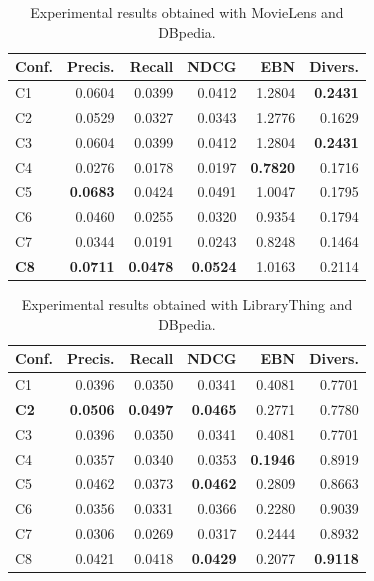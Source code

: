 \begin{table}
\centering
\begin{tabular}{@{}lrrrrr@{}}
\toprule
Conf.       & Precis.         & Recall          & NDCG            & EBN             & Divers. \\ \midrule
C1          & 0.0604          & 0.0399          & 0.0412          & 1.2804          & \textbf{0.2431} \\
C2          & 0.0529          & 0.0327          & 0.0343          & 1.2776          & 0.1629  \\
C3          & 0.0604          & 0.0399          & 0.0412          & 1.2804          & \textbf{0.2431} \\
C4          & 0.0276          & 0.0178          & 0.0197          & \textbf{0.7820} & 0.1716  \\
C5          & \textbf{0.0683} & 0.0424          & 0.0491          & 1.0047          & 0.1795  \\
C6          & 0.0460          & 0.0255          & 0.0320          & 0.9354          & 0.1794  \\
C7          & 0.0344          & 0.0191          & 0.0243          & 0.8248          & 0.1464  \\
\textbf{C8} & \textbf{0.0711} & \textbf{0.0478} & \textbf{0.0524} & 1.0163          & 0.2114  \\ \bottomrule
\end{tabular}
\caption[Experimental results with MovieLens and DBpedia]{Experimental results obtained with MovieLens and DBpedia.}
\label{srr:tab:ex1-ml}
\end{table}

\begin{table}
\centering
\begin{tabular}{@{}lrrrrr@{}}
\toprule
Conf.       & Precis.         & Recall          & NDCG            & EBN             & Divers. \\ \midrule
C1          & 0.0396          & 0.0350          & 0.0341          & 0.4081          & 0.7701  \\
\textbf{C2} & \textbf{0.0506} & \textbf{0.0497} & \textbf{0.0465} & 0.2771          & 0.7780  \\
C3          & 0.0396          & 0.0350          & 0.0341          & 0.4081          & 0.7701  \\
C4          & 0.0357          & 0.0340          & 0.0353          & \textbf{0.1946} & 0.8919  \\
C5          & 0.0462          & 0.0373          & \textbf{0.0462} & 0.2809          & 0.8663  \\
C6          & 0.0356          & 0.0331          & 0.0366          & 0.2280          & 0.9039  \\
C7          & 0.0306          & 0.0269          & 0.0317          & 0.2444          & 0.8932  \\
C8          & 0.0421          & 0.0418          & \textbf{0.0429} & 0.2077          & \textbf{0.9118} \\ \bottomrule
\end{tabular}
\caption[Experimental results with LibraryThing and DBpedia]{Experimental results obtained with LibraryThing and DBpedia.}
\label{srr:tab:ex1-lt}
\end{table}

